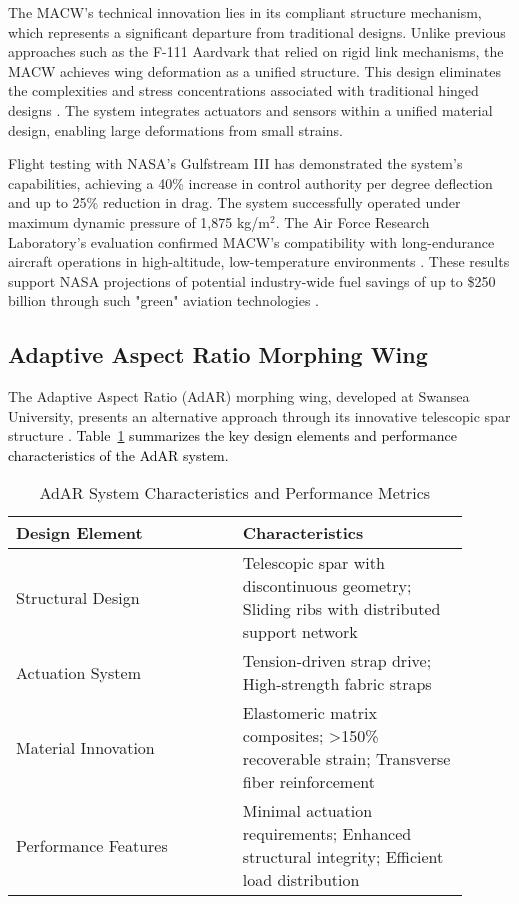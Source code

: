 \documentclass[letterpaper, journal, twoside]{IEEEtran}
\newcommand{\revision}[1]{\textcolor{black}{ #1}}
\begin{document}
The MACW's technical innovation lies in its compliant structure mechanism, which represents a significant departure from traditional designs. Unlike previous approaches such as the F-111 Aardvark that relied on rigid link mechanisms, the MACW achieves wing deformation as a unified structure. This design eliminates the complexities and stress concentrations associated with traditional hinged designs \cite{smith1992variable}. The system integrates actuators and sensors within a unified material design, enabling large deformations from small strains.

Flight testing with NASA's Gulfstream III has demonstrated the system's capabilities, achieving a 40\% increase in control authority per degree deflection and up to 25\% reduction in drag. The system successfully operated under maximum dynamic pressure of 1,875 kg/m$^2$. The Air Force Research Laboratory's evaluation confirmed MACW's compatibility with long-endurance aircraft operations in high-altitude, low-temperature environments \cite{kota2009mission}. These results support NASA projections of potential industry-wide fuel savings of up to \$250 billion through such "green" aviation technologies \cite{merlin2020green}.

\subsection{Adaptive Aspect Ratio Morphing Wing}
The Adaptive Aspect Ratio (AdAR) morphing wing, developed at Swansea University, presents an alternative approach through its innovative telescopic spar structure \cite{woods2015adaptive}. \revision{Table~\ref{tbl:adar_characteristics} summarizes the key design elements and performance characteristics of the AdAR system.}

\begin{table}[t]
\caption{AdAR System Characteristics and Performance Metrics}
\label{tbl:adar_characteristics}
\begin{tabular}{p{0.45\linewidth}p{0.45\linewidth}}
\toprule
\textbf{Design Element} & \textbf{Characteristics} \\
\midrule
Structural Design & Telescopic spar with discontinuous geometry; Sliding ribs with distributed support network \\
\midrule
Actuation System & Tension-driven strap drive; High-strength fabric straps \\
\midrule
Material Innovation & Elastomeric matrix composites; >150\% recoverable strain; Transverse fiber reinforcement \\
\midrule
Performance Features & Minimal actuation requirements; Enhanced structural integrity; Efficient load distribution \\
\bottomrule
\end{tabular}
\end{table}
\end{document}
